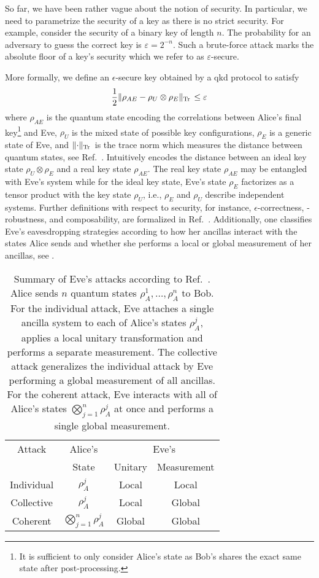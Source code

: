 So far, we have been rather vague about the notion of security.
In particular, we need to parametrize the security of a key as there is no strict security.
For example, consider the security of a binary key of length $n$.
The probability for an adversary to guess the correct key is $\varepsilon=2^{-n}$.
Such a brute-force attack marks the absolute floor of a key's security which we refer to as $\varepsilon$-secure.

More formally, we define an $\epsilon$-secure key obtained by a \gls{qkd} protocol to satisfy~\cite[p.~10]{Scarani2009}
\begin{equation}
	\frac{1}{2}
	\lVert\rho_{AE}-\rho_U\otimes\rho_E\rVert_{\operatorname{Tr}{}}
	\leq
	\varepsilon
	\label{eq:qkd_security}
\end{equation}
where $\rho_{AE}$ is the quantum state encoding the correlations between Alice's final key\footnote{It is sufficient to only consider Alice's state as Bob's shares the exact same state after post-processing.} and Eve, $\rho_U$ is the mixed state of possible key configurations, $\rho_E$ is a generic state of Eve, and $\lVert\cdot\rVert_{\operatorname{Tr}{}}$ is the trace norm which measures the distance between quantum states, see Ref.~\cite[p.~49]{Wolf2021}.
Intuitively  encodes the distance between an ideal key state $\rho_U\otimes\rho_E$ and a real key state $\rho_{AE}$.
The real key state $\rho_{AE}$ may be entangled with Eve's system while for the ideal key state, Eve's state $\rho_E$ factorizes as a tensor product with the key state $\rho_U$, i.e., $\rho_E$ and $\rho_U$ describe independent systems.
Further definitions with respect to security, for instance, $\epsilon$-correctness, -robustness, and composability, are formalized in Ref.~\cite[p.~119]{Wolf2021}.
Additionally, one classifies Eve's eavesdropping strategies according to how her ancillas interact with the states Alice sends and whether she performs a local or global measurement of her ancillas, see .
\begin{table}[htb]
	\centering
	\begin{tabular}{cccc}
		\toprule
			Attack & Alice's & \multicolumn{2}{c}{Eve's} \\
			& State & Unitary & Measurement \\
		\midrule
			Individual & $\rho_A^j$ & Local & Local \\
			Collective & $\rho_A^j$ & Local & Global \\
			Coherent & $\bigotimes_{j=1}^n\rho_A^j$ & Global & Global \\
		\bottomrule
	\end{tabular}
	\caption{Summary of Eve's attacks according to Ref.~\cite[p.~128]{Wolf2021}. Alice sends $n$ quantum states $\rho_A^1,\dots,\rho_A^n$ to Bob. For the individual attack, Eve attaches a single ancilla system to each of Alice's states $\rho_A^j$, applies a local unitary transformation and performs a separate measurement. The collective attack generalizes the individual attack by Eve performing a global measurement of all ancillas. For the coherent attack, Eve interacts with all of Alice's states $\bigotimes_{j=1}^n\rho_A^j$ at once and performs a single global measurement.}\label{tab:eavesdropping_strategies}
\end{table}
